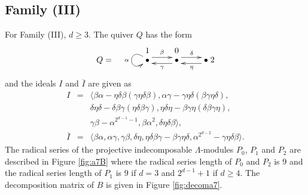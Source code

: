 \documentclass{amsart}
\theoremstyle{plain}
\theoremstyle{definition}
\theoremstyle{remark}
\begin{document}
\subsection{Family (III)}
\label{ss:a7A}
For Family (III), $d\ge 3$. The quiver $Q$ has the form
$$\xymatrix @R=-.2pc {
&1&0&\\
 Q= \quad&\ar@(ul,dl)_{\alpha} \bullet \ar@<.8ex>[r]^{\beta} \ar@<.9ex>[r];[]^{\gamma}
& \bullet \ar@<.8ex>[r]^(.46){\delta} \ar@<.9ex>[r];[]^(.54){\eta} & \bullet\;2}$$
and the ideals $I$ and $\overline{I}$ are given as
\begin{eqnarray*}
I&=&\langle \beta\alpha-\eta\delta\beta(\gamma\eta\delta\beta),
\alpha\gamma-\gamma\eta\delta(\beta\gamma\eta\delta), \\
&& \delta\eta\delta-\delta\beta\gamma(\eta\delta\beta\gamma),
\eta\delta\eta-\beta\gamma\eta(\delta\beta\gamma\eta),\\
&& \gamma\beta-\alpha^{2^{d-1}-1},\beta\alpha^2,\delta\eta\delta\beta\rangle,\\
\overline{I}&=&\langle \beta\alpha,\alpha\gamma, \gamma\beta,\delta\eta,\eta\delta\beta\gamma-
\beta\gamma\eta\delta,\alpha^{2^{d-2}}-\gamma\eta\delta\beta\rangle.
\end{eqnarray*}
The radical series of the projective indecomposable $\Lambda$-modules $P_0$, $P_1$ and $P_2$ 
are described in  Figure \ref{fig:a7B} 
where the radical series length of $P_0$ and $P_2$ is $9$ and the radical series length of $P_1$
is $9$ if $d=3$ and $2^{d-1}+1$ if $d\ge 4$.
The decomposition matrix of $B$ is given in Figure \ref{fig:decoma7}.
\end{document}
